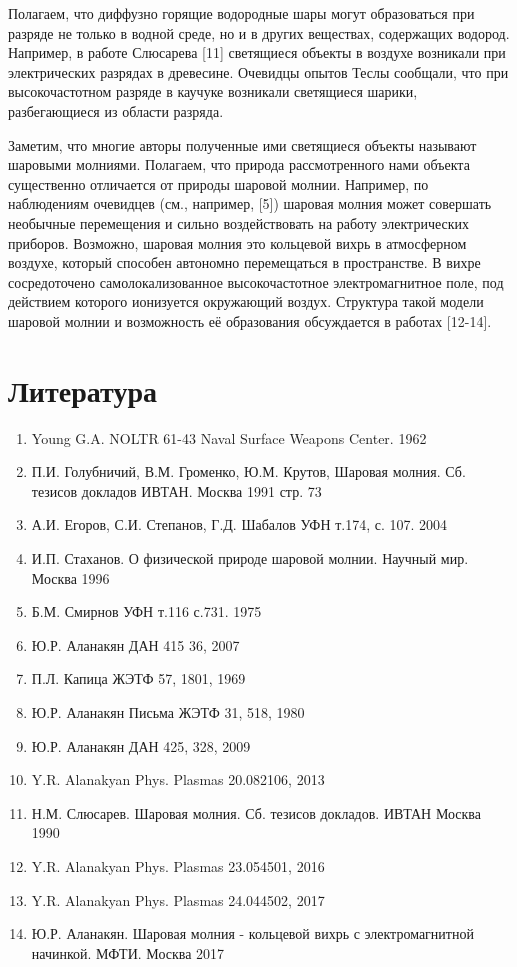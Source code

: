 \documentclass[a4paper]{article}
\begin{document}
Полагаем, что диффузно горящие водородные шары могут образоваться при разряде не только в водной среде, но и в других веществах, содержащих водород. Например, в работе Слюсарева [11] светящиеся объекты в воздухе возникали при электрических разрядах в древесине. Очевидцы опытов Теслы сообщали, что при высокочастотном разряде в каучуке возникали светящиеся шарики, разбегающиеся из области разряда.

Заметим, что многие авторы полученные ими светящиеся объекты называют шаровыми молниями. Полагаем, что природа рассмотренного нами объекта существенно отличается от природы шаровой молнии. Например, по наблюдениям очевидцев (см., например, [5]) шаровая молния может совершать необычные перемещения и сильно воздействовать на работу электрических приборов. Возможно, шаровая молния это кольцевой вихрь в атмосферном воздухе, который способен автономно перемещаться в пространстве. В вихре сосредоточено самолокализованное высокочастотное электромагнитное поле, под действием которого ионизуется окружающий воздух. Структура такой модели шаровой молнии и возможность её образования обсуждается в работах [12-14]. 

\newpage
\section{Литература}
\begin{enumerate}
    \item Young G.A. NOLTR 61-43 Naval Surface Weapons Center. 1962
    \item П.И. Голубничий, В.М. Громенко, Ю.М. Крутов, Шаровая молния. Сб. тезисов докладов ИВТАН. Москва 1991 стр. 73
    \item А.И. Егоров, С.И. Степанов, Г.Д. Шабалов УФН т.174, с. 107. 2004
    \item И.П. Стаханов. О физической природе шаровой молнии. Научный мир. Москва 1996
    \item Б.М. Смирнов УФН т.116 с.731. 1975
    \item Ю.Р. Аланакян ДАН 415 36, 2007
    \item П.Л. Капица ЖЭТФ 57, 1801, 1969
    \item Ю.Р. Аланакян Письма ЖЭТФ 31, 518, 1980
    \item Ю.Р. Аланакян ДАН 425, 328, 2009
    \item Y.R. Alanakyan Phys. Plasmas 20.082106, 2013
    \item Н.М. Слюсарев. Шаровая молния. Сб. тезисов докладов. ИВТАН Москва 1990
    \item Y.R. Alanakyan Phys. Plasmas 23.054501, 2016
    \item Y.R. Alanakyan Phys. Plasmas 24.044502, 2017
    \item Ю.Р. Аланакян. Шаровая молния - кольцевой вихрь с электромагнитной начинкой. МФТИ. Москва 2017
    
    
\end{enumerate}

 
\end{document}
